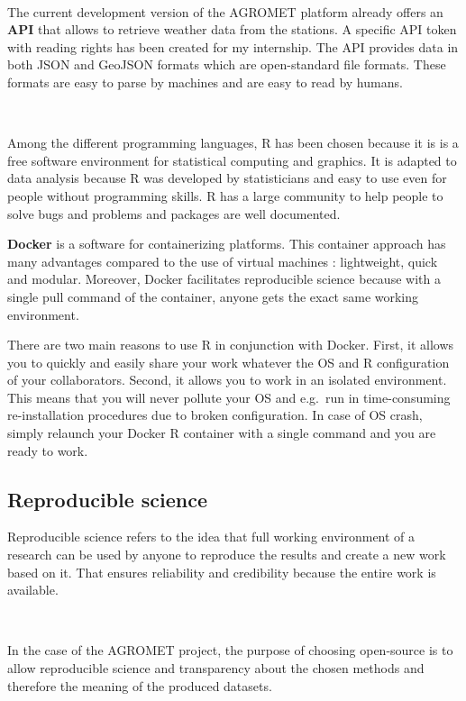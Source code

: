 \documentclass[12pt,twoside]{reedthesis}
\theoremstyle{definition}
\theoremstyle{definition}
\theoremstyle{definition}
\theoremstyle{remark}
\begin{document}
~

The current development version of the AGROMET platform already offers
an \textbf{API} that allows to retrieve weather data from the stations.
A specific API token with reading rights has been created for my
internship. The API provides data in both JSON and GeoJSON formats which
are open-standard file formats. These formats are easy to parse by
machines and are easy to read by humans.

~

Among the different programming languages, R has been chosen because it
is is a free software environment for statistical computing and
graphics. It is adapted to data analysis because R was developed by
statisticians and easy to use even for people without programming
skills. R has a large community to help people to solve bugs and
problems and packages are well documented.

\textbf{Docker} is a software for containerizing platforms. This
container approach has many advantages compared to the use of virtual
machines : lightweight, quick and modular. Moreover, Docker facilitates
reproducible science because with a single pull command of the
container, anyone gets the exact same working environment.

There are two main reasons to use R in conjunction with Docker. First,
it allows you to quickly and easily share your work whatever the OS and
R configuration of your collaborators. Second, it allows you to work in
an isolated environment. This means that you will never pollute your OS
and e.g.~run in time-consuming re-installation procedures due to broken
configuration. In case of OS crash, simply relaunch your Docker R
container with a single command and you are ready to work.

\subsection{Reproducible science}\label{reproducible-science}

Reproducible science refers to the idea that full working environment of
a research can be used by anyone to reproduce the results and create a
new work based on it. That ensures reliability and credibility because
the entire work is available.

~

In the case of the AGROMET project, the purpose of choosing open-source
is to allow reproducible science and transparency about the chosen
methods and therefore the meaning of the produced datasets.
\end{document}

